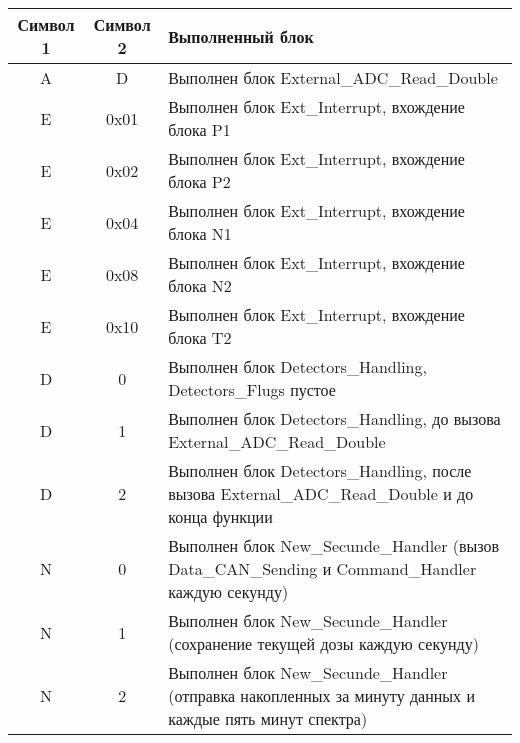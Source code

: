 \begin{center}
	\begin{tabularx}{\textwidth}{|c|c|X|}
		\hline
		Символ 1 & Символ 2 & Выполненный блок                                                                                        \\ \hline
		   A     &    D     & Выполнен блок External\_ADC\_Read\_Double                                                               \\ \hline
		   E     &   0x01   & Выполнен блок Ext\_Interrupt, вхождение блока P1                                                        \\ \hline
		   E     &   0x02   & Выполнен блок Ext\_Interrupt, вхождение блока P2                                                        \\ \hline
		   E     &   0x04   & Выполнен блок Ext\_Interrupt, вхождение блока N1                                                        \\ \hline
		   E     &   0x08   & Выполнен блок Ext\_Interrupt, вхождение блока N2                                                        \\ \hline
		   E     &   0x10   & Выполнен блок Ext\_Interrupt, вхождение блока T2                                                        \\ \hline
		   D     &    0     & Выполнен блок Detectors\_Handling, Detectors\_Flugs пустое                                              \\ \hline
		   D     &    1     & Выполнен блок Detectors\_Handling, до вызова External\_ADC\_Read\_Double                                \\ \hline
		   D     &    2     & Выполнен блок Detectors\_Handling, после вызова External\_ADC\_Read\_Double и до конца функции          \\ \hline
		   N     &    0     & Выполнен блок New\_Secunde\_Handler (вызов Data\_CAN\_Sending и Command\_Handler каждую секунду)        \\ \hline
		   N     &    1     & Выполнен блок New\_Secunde\_Handler (сохранение текущей дозы каждую секунду)                            \\ \hline
		   N     &    2     & Выполнен блок New\_Secunde\_Handler (отправка накопленных за минуту данных и каждые пять минут спектра) \\ \hline
	\end{tabularx}  
\end{center}
\normalsize





